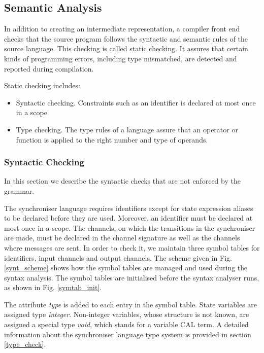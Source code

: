 


\subsection{Semantic Analysis}
In addition to creating an intermediate representation, a compiler front end checks that the source program follows the syntactic and semantic rules of the source language. This checking is called static checking. It assures that certain kinds of programming errors, including type mismatched, are detected and reported during compilation.

Static checking includes:
\begin{itemize}
\item Syntactic checking. Constraints such as an identifier is declared at most once in a scope
\item Type checking. The type rules of a language assure that an operator or function is applied to the right number and type of operands.
\end{itemize}

  \subsubsection{Syntactic Checking}
In this section we describe the syntactic checks that are not enforced by the grammar.

The synchroniser language requires identifiers except for state expression aliases to be declared before they are used. Moreover, an identifier must be declared at most once in a scope. The channels, on which the transitions in the synchroniser are made, must be declared in the channel signature as well as the channels where messages are sent. In order to check it, we maintain three symbol tables for identifiers, input channels and output channels. The scheme given in Fig. \ref{synt_scheme} shows how the symbol tables are managed and used during the syntax analysis. The symbol tables are initialised before the syntax analyser runs, as shown in Fig. \ref{symtab_init}.

The attribute \emph{type} is added to each entry in the symbol table. State variables are assigned type \emph{integer}. Non-integer variables, whose structure is not known, are assigned a special type \emph{void}, which stands for a variable CAL term. A detailed information about the synchroniser language type system is provided in section \ref{type_check}.


